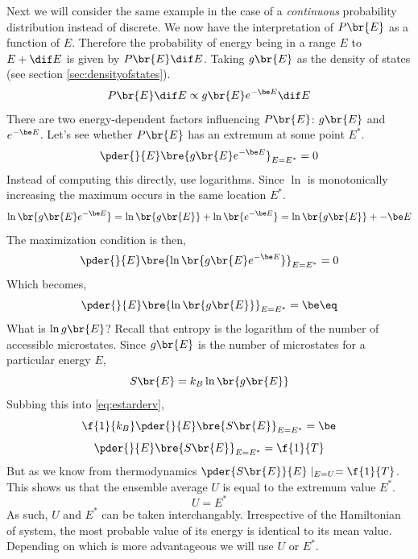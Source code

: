 \documentclass{article}
\begin{document}
{Next we will consider the same example in the case of a \textit{continuous} probability distribution instead of discrete. We now have the interpretation of $P\br{E}$ as a function of $E$. Therefore the probability of energy being in a range $E$ to $E + \dif E$ is given by $P\br{E} \dif E$. Taking $g\br{E}$ as the density of states (see section \ref{sec:densityofstates}).
\[ P\br{E} \dif E \propto g\br{E} e^{-\be E} \dif E \]
There are two energy-dependent factors influencing $P\br{E}$: $g\br{E}$ and $e^{-\be E}$. Let's see whether $P\br{E}$ has an extremum at some point $E^*$.
\[ \pder{}{E}\bre{g\br{E} e^{-\be E}}_{E = E^*} = 0 \]
Instead of computing this directly, use logarithms. Since $\ln$ is monotonically increasing the maximum occurs in the same location $E^*$.
\[ \ln \br{g\br{E} e^{-\be E}} = \ln\br{g\br{E}} + \ln\br{e^{-\be E}} = \ln\br{g\br{E}} + -\be E \]
The maximization condition is then,
\[ \pder{}{E}\bre{\ln \br{g\br{E} e^{-\be E}}}_{E = E^*} = 0 \]
Which becomes,
\[ \pder{}{E}\bre{\ln \br{g\br{E}}}_{E = E^*} = \be \eq \label{eq:estarderv}\]
What is $\ln g\br{E}$? Recall that entropy is the logarithm of the number of accessible microstates. Since $g\br{E}$ is the number of microstates for a particular energy $E$,
\[ S\br{E} = k_B \ln\br{g\br{E}} \]
Subbing this into \eqref{eq:estarderv},
\[ \f{1}{k_B}\pder{}{E}\bre{S\br{E}}_{E = E^*} = \be \]
\[ \pder{}{E}\bre{S\br{E}}_{E = E^*} = \f{1}{T} \]
But as we know from thermodynamics $\pder{S\br{E}}{E} \mid_{E=U} = \f{1}{T}$. This shows us that the ensemble average $U$ is equal to the extremum value $E^*$.
\[ U = E^* \]
As such, $U$ and $E^*$ can be taken interchangably. Irrespective of the Hamiltonian of system, the most probable value of its energy is identical to its mean value. Depending on which is more advantageous we will use $U$ or $E^*$.\\

}
\end{document}
